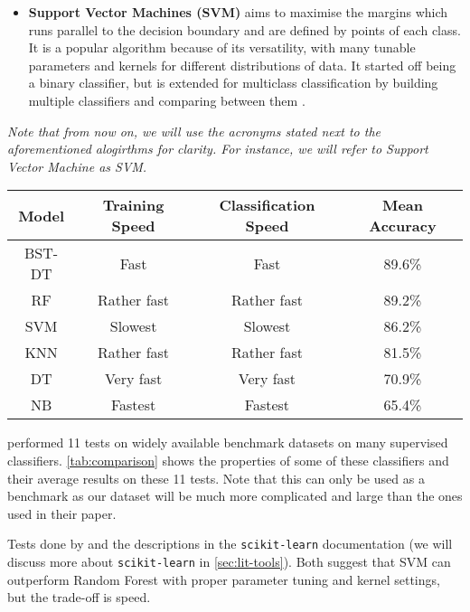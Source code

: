 \begin{itemize}
  \item \textbf{Support Vector Machines (SVM)} aims to maximise the margins which runs parallel to the decision boundary and are defined by points of each class. It is a popular algorithm because of its versatility, with many tunable parameters and kernels for different distributions of data. It started off being a binary classifier, but is extended for multiclass classification by building multiple classifiers and comparing between them \cite{bishop-book}. 
\end{itemize}

\textit{Note that from now on, we will use the acronyms stated next to the aforementioned alogirthms for clarity. For instance, we will refer to Support Vector Machine as SVM.}
\\

\parbox{\linewidth}{
  \centering
  \begin{tabular}{|c|c|c|c|}
    \hline
    \textbf{Model} & \textbf{Training Speed} & \textbf{Classification Speed} & \textbf{Mean Accuracy}
    \\\hline
    BST-DT   & Fast           & Fast        & 89.6\%
    \\\hline
    RF       & Rather fast    & Rather fast & 89.2\%
    \\\hline
    SVM      & Slowest        & Slowest     & 86.2\%
    \\\hline
    KNN      & Rather fast    & Rather fast & 81.5\%
    \\\hline
    DT       & Very fast      & Very fast   & 70.9\%
    \\\hline
    NB       & Fastest        & Fastest     & 65.4\% 
    \\\hline
  \end{tabular}

  \label{tab:comparison}
}

 performed 11 tests on widely available benchmark datasets on many supervised classifiers. \autoref{tab:comparison} shows the properties of some of these classifiers and their average results on these 11 tests. Note that this can only be used as a benchmark as our dataset will be much more complicated and large than the ones used in their paper. 

Tests done by  and the descriptions in the \texttt{scikit-learn} documentation (we will discuss more about \texttt{scikit-learn} in \autoref{sec:lit-tools}). Both suggest that SVM can outperform Random Forest with proper parameter tuning and kernel settings, but the trade-off is speed.

